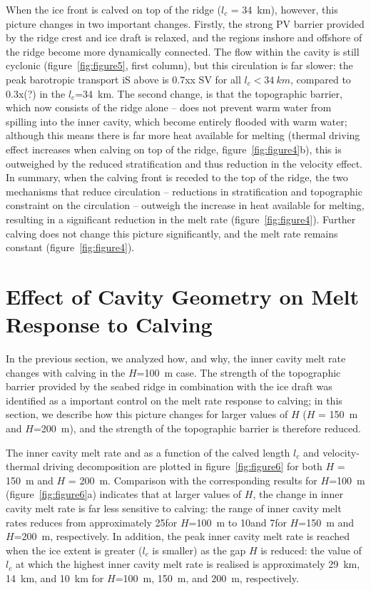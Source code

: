 \documentclass[draft]{agujournal2019}
\begin{document}
When the ice front is calved on top of the ridge ($l_c$ = 34~km), however, this picture changes in two important changes. Firstly, the strong PV barrier provided by the ridge crest and ice draft is relaxed, and the regions inshore and offshore of the ridge become more dynamically connected. The flow within the cavity is still cyclonic (figure~\ref{fig:figure5}, first column), but this circulation is far slower: the peak barotropic transport iS above is 0.7xx SV for all $l_c < 34~km$, compared to 0.3x(?) in the $l_c$=34~km. The second change, is that the topographic barrier, which now consists of the ridge alone -- does not prevent warm water from spilling into the inner cavity, which become entirely flooded with warm water; although this means there is far more heat available for melting (thermal driving effect increases when calving on top of the ridge, figure~\ref{fig:figure4}b), this is outweighed by the reduced stratification and thus reduction in the velocity effect. In summary, when the calving front is receded to the top of the ridge, the two mechanisms that reduce circulation -- reductions in stratification and topographic constraint on the circulation -- outweigh the increase in heat available for melting, resulting in a significant reduction in the melt rate (figure~\ref{fig:figure4}). Further calving does not change this picture significantly, and the melt rate remains constant (figure~\ref{fig:figure4}).


\section{Effect of Cavity Geometry on Melt Response to Calving}\label{S:Results:H}
In the previous section, we analyzed how, and why, the inner cavity melt rate changes with calving in the $H$=100~m case. The strength of the topographic barrier provided by the seabed ridge in combination with the ice draft was identified as a important control on the melt rate response to calving; in this section, we describe how this picture changes for larger values of $H$ ($H$ = 150~m and $H$=200~m), and the strength of the topographic barrier is therefore reduced.

The inner cavity melt rate and as a function of the calved length $l_c$ and velocity-thermal driving decomposition are plotted in figure~\ref{fig:figure6} for both $H$ = 150~m and $H$ = 200~m. Comparison with the corresponding results for $H$=100~m (figure~\ref{fig:figure6}a) indicates that at larger values of $H$, the change in inner cavity melt rate is far less sensitive to calving: the range of inner cavity melt rates reduces from approximately 25\mpryr for $H$=100~m to 10\mpryr and 7\mpryr for $H$=150~m and $H$=200~m, respectively. In addition, the peak inner cavity melt rate is reached when the ice extent is greater ($l_c$ is smaller) as the gap $H$ is reduced: the value of $l_c$ at which the highest inner cavity melt rate is realised is approximately 29~km, 14~km, and 10~km for $H$=100~m, 150~m, and 200~m, respectively.
\end{document}

